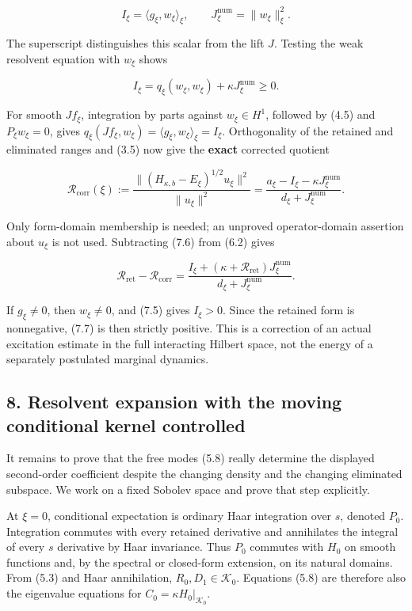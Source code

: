 \[
I_\xi=\langle g_\xi,w_\xi\rangle_\xi,
\qquad J_\xi^{\mathrm{num}}=\|w_\xi\|_\xi^2.
\tag{7.4}
\]

The superscript distinguishes this scalar from the lift \(J\). Testing
the weak resolvent equation with \(w_\xi\) shows

\[
I_\xi=q_\xi(w_\xi,w_\xi)+\kappa J_\xi^{\mathrm{num}}\geq0.
\tag{7.5}
\]

For smooth \(Jf_\xi\), integration by parts against \(w_\xi\in H^1\),
followed by (4.5) and \(P_\xi w_\xi=0\), gives
\(q_\xi(Jf_\xi,w_\xi)=\langle g_\xi,w_\xi\rangle_\xi=I_\xi\).
Orthogonality of the retained and eliminated ranges and (3.5) now give
the \textbf{exact} corrected quotient

\[
\mathcal R_{\mathrm{corr}}(\xi)
:=\frac{\|(H_{\kappa,b}-E_\xi)^{1/2}u_\xi\|^2}{\|u_\xi\|^2}
=\frac{a_\xi-I_\xi-\kappa J_\xi^{\mathrm{num}}}{d_\xi+J_\xi^{\mathrm{num}}}.
\tag{7.6}
\]

Only form-domain membership is needed; an unproved operator-domain
assertion about \(u_\xi\) is not used. Subtracting (7.6) from (6.2)
gives

\[
\mathcal R_{\mathrm{ret}}-\mathcal R_{\mathrm{corr}}
=\frac{I_\xi+(\kappa+\mathcal R_{\mathrm{ret}})J_\xi^{\mathrm{num}}}
 {d_\xi+J_\xi^{\mathrm{num}}}.
\tag{7.7}
\]

If \(g_\xi\ne0\), then \(w_\xi\ne0\), and (7.5) gives \(I_\xi>0\). Since
the retained form is nonnegative, (7.7) is then strictly positive. This
is a correction of an actual excitation estimate in the full interacting
Hilbert space, not the energy of a separately postulated marginal
dynamics.

\subsection{8. Resolvent expansion with the moving conditional kernel
controlled}\label{bulk-resolvent-expansion-with-the-moving-conditional-kernel-controlled}

It remains to prove that the free modes (5.8) really determine the
displayed second-order coefficient despite the changing density and the
changing eliminated subspace. We work on a fixed Sobolev space and prove
that step explicitly.

At \(\xi=0\), conditional expectation is ordinary Haar integration over
\(s\), denoted \(P_0\). Integration commutes with every retained
derivative and annihilates the integral of every \(s\) derivative by
Haar invariance. Thus \(P_0\) commutes with \(H_0\) on smooth functions
and, by the spectral or closed-form extension, on its natural domains.
From (5.3) and Haar annihilation, \(R_0,D_1\in\mathcal K_0\). Equations
(5.8) are therefore also the eigenvalue equations for
\(C_0=\kappa H_0|_{\mathcal K_0}\).


